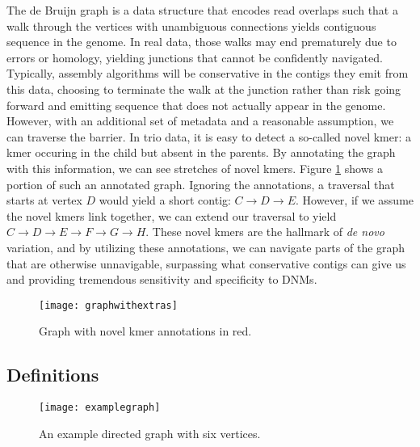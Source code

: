 The de Bruijn graph is a data structure that encodes read overlaps such that a walk through the vertices with unambiguous connections yields contiguous sequence in the genome.  In real data, those walks may end prematurely due to errors or homology, yielding junctions that cannot be confidently navigated.  Typically, assembly algorithms will be conservative in the contigs they emit from this data, choosing to terminate the walk at the junction rather than risk going forward and emitting sequence that does not actually appear in the genome.  However, with an additional set of metadata and a reasonable assumption, we can traverse the barrier.  In trio data, it is easy to detect a so-called novel kmer: a kmer occuring in the child but absent in the parents.  By annotating the graph with this information, we can see stretches of novel kmers.  Figure \ref{fig:graphwithextras} shows a portion of such an annotated graph.  Ignoring the annotations, a traversal that starts at vertex $D$ would yield a short contig: $C \rightarrow D \rightarrow E$.  However, if we assume the novel kmers link together, we can extend our traversal to yield $C \rightarrow D \rightarrow E \rightarrow F \rightarrow G \rightarrow H$.  These novel kmers are the hallmark of \textit{de novo} variation, and by utilizing these annotations, we can navigate parts of the graph that are otherwise unnavigable, surpassing what conservative contigs can give us and providing tremendous sensitivity and specificity to DNMs.

\begin{figure}[h!]
  \centering
    \texttt{[image: graphwithextras]}
  \caption{Graph with novel kmer annotations in red.}
  \label{fig:graphwithextras}
\end{figure}

\subsection{Definitions}

\begin{figure}[h!]
  \centering
    \texttt{[image: examplegraph]}
  \caption{An example directed graph with six vertices.}
  \label{fig:examplegraph}
\end{figure}

